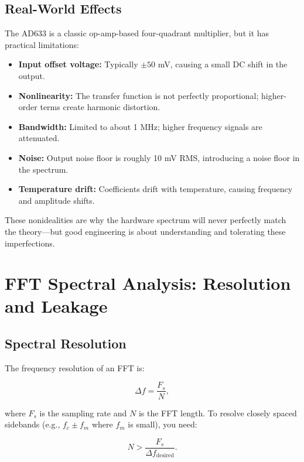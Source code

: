 \documentclass[11pt,letterpaper]{article}
\begin{document}
\subsection{Real-World Effects}

The AD633 is a classic op-amp-based four-quadrant multiplier, but it has practical limitations:

\begin{itemize}
    \item \textbf{Input offset voltage:} Typically $\pm 50$ mV, causing a small DC shift in the output.
    \item \textbf{Nonlinearity:} The transfer function is not perfectly proportional; higher-order terms create harmonic distortion.
    \item \textbf{Bandwidth:} Limited to about 1 MHz; higher frequency signals are attenuated.
    \item \textbf{Noise:} Output noise floor is roughly 10 mV RMS, introducing a noise floor in the spectrum.
    \item \textbf{Temperature drift:} Coefficients drift with temperature, causing frequency and amplitude shifts.
\end{itemize}

\noindent
These nonidealities are why the hardware spectrum will never perfectly match the theory—but good engineering is about understanding and tolerating these imperfections.

\section{FFT Spectral Analysis: Resolution and Leakage}

\subsection{Spectral Resolution}

The frequency resolution of an FFT is:

\begin{equation}
\Delta f = \frac{F_s}{N},
\end{equation}

\noindent
where $F_s$ is the sampling rate and $N$ is the FFT length. To resolve closely spaced sidebands (e.g., $f_c \pm f_m$ where $f_m$ is small), you need:

\begin{equation}
N > \frac{F_s}{\Delta f_{\text{desired}}}.
\end{equation}
\end{document}
